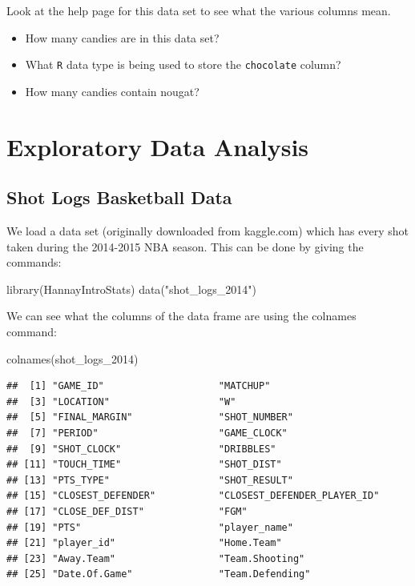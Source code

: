 \documentclass[
]{book}
\newenvironment{Shaded}{\begin{snugshade}}{\end{snugshade}}
\newcommand{\FunctionTok}[1]{\textcolor[rgb]{0.00,0.00,0.00}{#1}}
\newcommand{\NormalTok}[1]{#1}
\newcommand{\StringTok}[1]{\textcolor[rgb]{0.31,0.60,0.02}{#1}}
\providecommand{\tightlist}{%
  \setlength{\itemsep}{0pt}\setlength{\parskip}{0pt}}
\theoremstyle{definition}
\theoremstyle{definition}
\theoremstyle{definition}
\theoremstyle{definition}
\theoremstyle{remark}
\begin{document}
Look at the help page for this data set to see what the various columns mean.

\begin{itemize}
\tightlist
\item
  How many candies are in this data set?
\item
  What \texttt{R} data type is being used to store the \texttt{chocolate} column?
\item
  How many candies contain nougat?
\end{itemize}

\hypertarget{exploratory-data-analysis}{%
\chapter{Exploratory Data Analysis}\label{exploratory-data-analysis}}

\hypertarget{shot-logs-basketball-data}{%
\section{Shot Logs Basketball Data}\label{shot-logs-basketball-data}}

We load a data set (originally downloaded from kaggle.com) which has every shot taken during the 2014-2015 NBA season. This can be done by giving the commands:

\begin{Shaded}
\begin{Highlighting}[]
\FunctionTok{library}\NormalTok{(HannayIntroStats)}
\FunctionTok{data}\NormalTok{(}\StringTok{"shot\_logs\_2014"}\NormalTok{)}
\end{Highlighting}
\end{Shaded}

We can see what the columns of the data frame are using the colnames command:

\begin{Shaded}
\begin{Highlighting}[]
\FunctionTok{colnames}\NormalTok{(shot\_logs\_2014)}
\end{Highlighting}
\end{Shaded}

\begin{verbatim}
##  [1] "GAME_ID"                    "MATCHUP"                   
##  [3] "LOCATION"                   "W"                         
##  [5] "FINAL_MARGIN"               "SHOT_NUMBER"               
##  [7] "PERIOD"                     "GAME_CLOCK"                
##  [9] "SHOT_CLOCK"                 "DRIBBLES"                  
## [11] "TOUCH_TIME"                 "SHOT_DIST"                 
## [13] "PTS_TYPE"                   "SHOT_RESULT"               
## [15] "CLOSEST_DEFENDER"           "CLOSEST_DEFENDER_PLAYER_ID"
## [17] "CLOSE_DEF_DIST"             "FGM"                       
## [19] "PTS"                        "player_name"               
## [21] "player_id"                  "Home.Team"                 
## [23] "Away.Team"                  "Team.Shooting"             
## [25] "Date.Of.Game"               "Team.Defending"
\end{verbatim}
\end{document}
